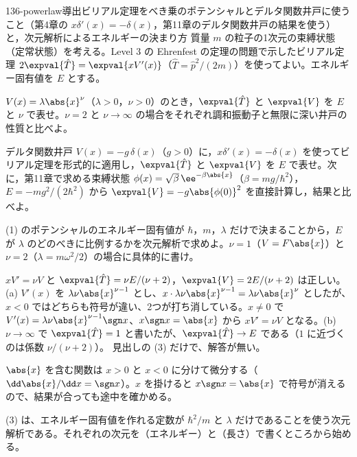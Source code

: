 \documentclass[uplatex,dvipdfmx,a4paper,11pt]{jsarticle}
\begin{document}
\begin{mondai}{136-powerlaw}{導出}{ビリアル定理をべき乗のポテンシャルとデルタ関数井戸に使うこと（第4章の $x\delta'(x)=-\delta(x)$，第11章のデルタ関数井戸の結果を使う）と，次元解析によるエネルギーの決まり方}
質量 $m$ の粒子の1次元の束縛状態（定常状態）を考える。Level 3 の Ehrenfest の定理の問題で示したビリアル定理 $2\expval{\hat{T}}=\expval{xV'(x)}$（$\hat{T}=\hat{p}^{2}/(2m)$）を使ってよい。エネルギー固有値を $E$ とする。
  \begin{shoumon}
    \item $V(x)=\lambda\abs{x}^{\nu}$（$\lambda>0$，$\nu>0$）のとき，$\expval{\hat{T}}$ と $\expval{V}$ を $E$ と $\nu$ で表せ。$\nu=2$ と $\nu\to\infty$ の場合をそれぞれ調和振動子と無限に深い井戸の性質と比べよ。
    \item デルタ関数井戸 $V(x)=-g\,\delta(x)$（$g>0$）に，$x\delta'(x)=-\delta(x)$ を使ってビリアル定理を形式的に適用し，$\expval{\hat{T}}$ と $\expval{V}$ を $E$ で表せ。次に，第11章で求める束縛状態 $\phi(x)=\sqrt{\beta}\,\ee^{-\beta\abs{x}}$（$\beta=mg/\hbar^{2}$），$E=-mg^{2}/(2\hbar^{2})$ から $\expval{V}=-g\abs{\phi(0)}^{2}$ を直接計算し，結果と比べよ。
    \item (1) のポテンシャルのエネルギー固有値が $\hbar$，$m$，$\lambda$ だけで決まることから，$E$ が $\lambda$ のどのべきに比例するかを次元解析で求めよ。$\nu=1$（$V=F\abs{x}$）と $\nu=2$（$\lambda=m\omega^{2}/2$）の場合に具体的に書け。
  \end{shoumon}

\begin{kotaeran}
   $xV'=\nu V$ と $\expval{\hat{T}}=\nu E/(\nu+2)$，$\expval{V}=2E/(\nu+2)$ は正しい。(a) $V'(x)$ を $\lambda\nu\abs{x}^{\nu-1}$ とし、$x\cdot\lambda\nu\abs{x}^{\nu-1}=\lambda\nu\abs{x}^{\nu}$ としたが、$x<0$ ではどちらも符号が違い、2つが打ち消している。$x\neq0$ で $V'(x)=\lambda\nu\abs{x}^{\nu-1}\sgn x$、$x\sgn x=\abs{x}$ から $xV'=\nu V$ となる。(b) $\nu\to\infty$ で $\expval{\hat{T}}=1$ と書いたが、$\expval{\hat{T}}\to E$ である（$1$ に近づくのは係数 $\nu/(\nu+2)$）。
   見出しの (3) だけで、解答が無い。
\end{kotaeran}
\begin{rikai}
  \item $\abs{x}$ を含む関数は $x>0$ と $x<0$ に分けて微分する（$\dd\abs{x}/\dd x=\sgn x$）。$x$ を掛けると $x\sgn x=\abs{x}$ で符号が消えるので、結果が合っても途中を確かめる。
  \item (3) は、エネルギー固有値を作れる定数が $\hbar^{2}/m$ と $\lambda$ だけであることを使う次元解析である。それぞれの次元を（エネルギー）と（長さ）で書くところから始める。
\end{rikai}
\end{mondai}
\end{document}
